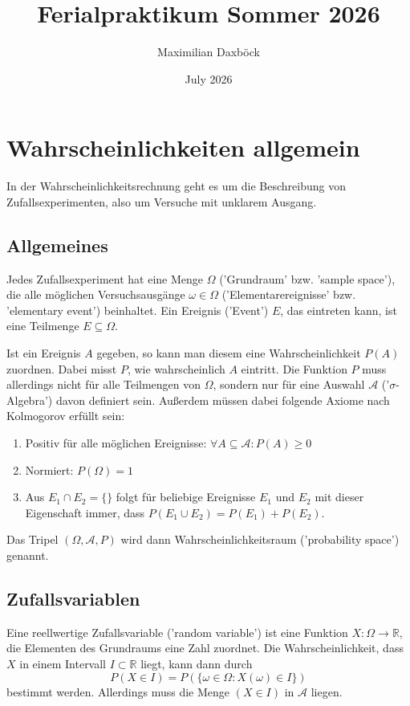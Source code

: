 \documentclass{article}
\title{Ferialpraktikum Sommer 2026}
\author{Maximilian Daxböck}
\date{July 2026}
\begin{document}
\maketitle


\section{Wahrscheinlichkeiten allgemein}
In der Wahrscheinlichkeitsrechnung geht es um die Beschreibung von Zufallsexperimenten, also um Versuche mit unklarem Ausgang.
\subsection{Allgemeines}

Jedes Zufallsexperiment hat eine Menge \(\Omega\) ('Grundraum' bzw. 'sample space'), die alle möglichen Versuchsausgänge \(\omega\in\Omega\) ('Elementarereignisse' bzw. 'elementary event') beinhaltet. Ein Ereignis ('Event') \(E\), das eintreten kann, ist eine Teilmenge \(E\subseteq\Omega\).

Ist ein Ereignis \(A\) gegeben, so kann man diesem eine Wahrscheinlichkeit \(P(A)\) zuordnen. Dabei misst \(P\), wie wahrscheinlich \(A\) eintritt. Die Funktion \(P\) muss allerdings nicht für alle Teilmengen von \(\Omega\), sondern nur für eine Auswahl \(\mathcal A\) ('\(\sigma\)-Algebra') davon definiert sein. Außerdem müssen dabei folgende Axiome nach Kolmogorov erfüllt sein:
\begin{enumerate}
    \item Positiv für alle möglichen Ereignisse: \(\forall A \subseteq \mathcal A:P(A)\geq0\)
    \item Normiert: \(P(\Omega)=1\)
    \item Aus \(E_1\cap E_2=\{\}\) folgt für beliebige Ereignisse \(E_1\) und \(E_2\) mit dieser Eigenschaft immer, dass \(P(E_1\cup E_2)=P(E_1)+P(E_2)\).
\end{enumerate}
Das Tripel \((\Omega,\mathcal A, P)\) wird dann Wahrscheinlichkeitsraum ('probability space') genannt.

\subsection{Zufallsvariablen}
Eine reellwertige Zufallsvariable ('random variable') ist eine Funktion \(X:\Omega\rightarrow \mathbb R\), die Elementen des Grundraums eine Zahl zuordnet. Die Wahrscheinlichkeit, dass \(X\) in einem Intervall \(I\subset\mathbb R\) liegt, kann dann durch\[
P(X\in I)=P(\{\omega\in\Omega:X(\omega)\in I\})
\]bestimmt werden. Allerdings muss die Menge \((X\in I)\) in \(\mathcal A\) liegen. 
\end{document}

